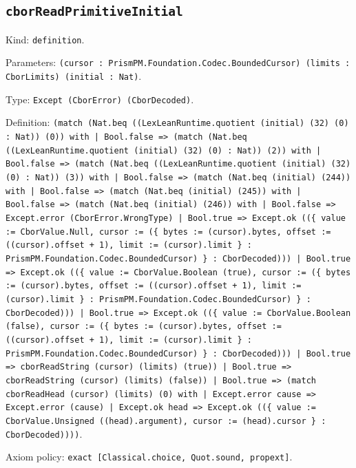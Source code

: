 \documentclass[11pt]{article}
\begin{document}
\subsection*{\texttt{cborReadPrimitiveInitial}}
\noindent Kind: \texttt{definition}.\par
\noindent Parameters: \texttt{(cursor : PrismPM.Foundation.Codec.BoundedCursor) (limits : CborLimits) (initial : Nat)}.\par
\noindent Type: \texttt{Except (CborError) (CborDecoded)}.\par
\noindent Definition: \texttt{(match (Nat.beq ((LexLeanRuntime.quotient (initial) (32) (0) : Nat)) (0)) with | Bool.false => (match (Nat.beq ((LexLeanRuntime.quotient (initial) (32) (0) : Nat)) (2)) with | Bool.false => (match (Nat.beq ((LexLeanRuntime.quotient (initial) (32) (0) : Nat)) (3)) with | Bool.false => (match (Nat.beq (initial) (244)) with | Bool.false => (match (Nat.beq (initial) (245)) with | Bool.false => (match (Nat.beq (initial) (246)) with | Bool.false => Except.error (CborError.WrongType) | Bool.true => Except.ok ((\{ value := CborValue.Null, cursor := (\{ bytes := (cursor).bytes, offset := ((cursor).offset + 1), limit := (cursor).limit \} : PrismPM.Foundation.Codec.BoundedCursor) \} : CborDecoded))) | Bool.true => Except.ok ((\{ value := CborValue.Boolean (true), cursor := (\{ bytes := (cursor).bytes, offset := ((cursor).offset + 1), limit := (cursor).limit \} : PrismPM.Foundation.Codec.BoundedCursor) \} : CborDecoded))) | Bool.true => Except.ok ((\{ value := CborValue.Boolean (false), cursor := (\{ bytes := (cursor).bytes, offset := ((cursor).offset + 1), limit := (cursor).limit \} : PrismPM.Foundation.Codec.BoundedCursor) \} : CborDecoded))) | Bool.true => cborReadString (cursor) (limits) (true)) | Bool.true => cborReadString (cursor) (limits) (false)) | Bool.true => (match cborReadHead (cursor) (limits) (0) with | Except.error cause => Except.error (cause) | Except.ok head => Except.ok ((\{ value := CborValue.Unsigned ((head).argument), cursor := (head).cursor \} : CborDecoded))))}.\par
\noindent Axiom policy: \texttt{exact [Classical.choice, Quot.sound, propext]}.\par
\end{document}
